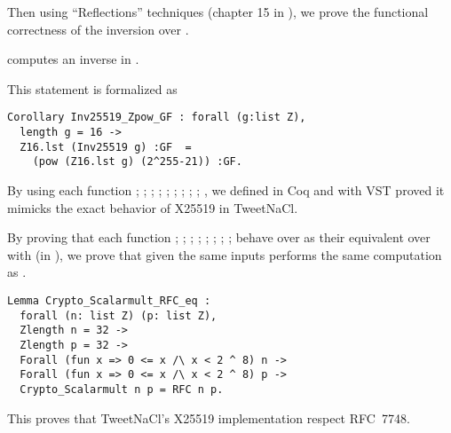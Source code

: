 Then using ``Reflections'' techniques (chapter 15 in \cite{CpdtJFR}), we prove
the functional correctness of the inversion over \Zfield.
\begin{lemma}
\label{cor:inv_comput_field}
 computes an inverse in \Zfield.
\end{lemma}
This statement is formalized as
\begin{lstlisting}[language=Coq]
Corollary Inv25519_Zpow_GF : forall (g:list Z),
  length g = 16 ->
  Z16.lst (Inv25519 g) :GF  =
    (pow (Z16.lst g) (2^255-21)) :GF.
\end{lstlisting}

\begin{sloppypar}
By using each function ; ; ; ;
; ; ; ; ;
, we defined in Coq  and with VST
proved it mimicks the exact behavior of X25519 in TweetNaCl.
\end{sloppypar}

\begin{sloppypar}
By proving that each function ; ; ;
; ; ; ;
;  behave over  as their equivalent
over  with  (in \Zfield), we prove that given the same inputs
 performs the same computation as .
\end{sloppypar}

\begin{lstlisting}[language=Coq]
Lemma Crypto_Scalarmult_RFC_eq :
  forall (n: list Z) (p: list Z),
  Zlength n = 32 ->
  Zlength p = 32 ->
  Forall (fun x => 0 <= x /\ x < 2 ^ 8) n ->
  Forall (fun x => 0 <= x /\ x < 2 ^ 8) p ->
  Crypto_Scalarmult n p = RFC n p.
\end{lstlisting}

This proves that TweetNaCl's X25519 implementation respect RFC~7748.

